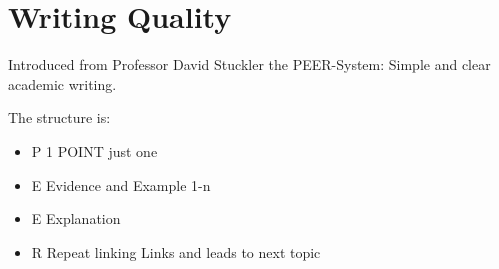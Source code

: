 \section{Writing Quality}\label{sec:writing-quality}

Introduced from Professor David Stuckler the PEER-System: Simple and clear academic writing.

The structure is:
\begin{itemize}
	\item P 1 POINT just one
	\item E Evidence and Example 1-n
	\item E Explanation
	\item R Repeat linking Links and leads to next topic
\end{itemize}
